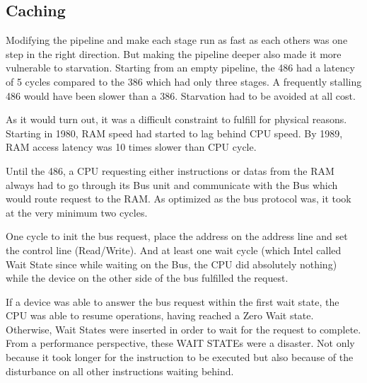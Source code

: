 \subsection{Caching }
Modifying the pipeline and make each stage run as fast as each others was one step in the right direction. But making the pipeline deeper also made it more vulnerable to starvation. Starting from an empty pipeline, the 486 had a latency of 5 cycles compared to the 386 which had only three stages. A frequently stalling 486 would have been slower than a 386. Starvation had to be avoided at all cost.\\
\par
  As it would turn out, it was a difficult constraint to fulfill for physical reasons. Starting in 1980, RAM speed had started to lag behind CPU speed. By 1989, RAM access latency was 10 times slower than CPU cycle.\\
\par
{}
\par
Until the 486, a CPU requesting either instructions or datas from the RAM always had to go through its Bus unit and communicate with the Bus which would route request to the RAM. As optimized as the bus protocol was, it took at the very minimum two cycles.\\
\par One cycle to init the bus request, place the address on the address line and set the control line (Read/Write). And at least one wait cycle (which Intel called Wait State since while waiting on the Bus, the CPU did absolutely nothing) while the device on the other side of the bus fulfilled the request.\\
\par
{}
\par
If a device was able to answer the bus request within the first wait state, the CPU was able to resume operations, having reached a Zero Wait state. Otherwise, Wait States were inserted in order to wait for the request to complete. From a performance perspective, these WAIT STATEs were a disaster. Not only because it took longer for the instruction to be executed but also because of the disturbance on all other instructions waiting behind.\\
\par
{}



